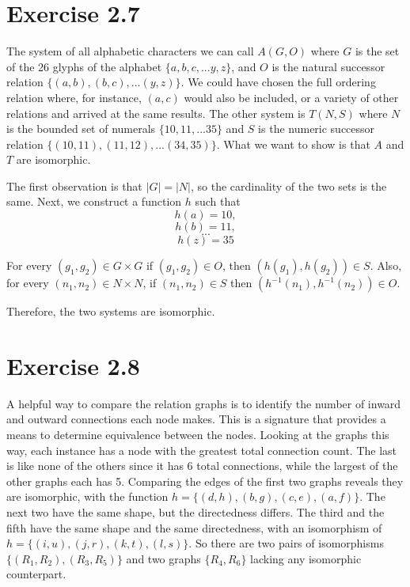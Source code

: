 \documentclass[12pt]{article}
\begin{document}
\maketitle

\section{Exercise 2.7}

The system of all alphabetic characters we can call $A(G, O)$ where $G$ is the set of the 26 glyphs of the alphabet $\{a,b,c,...y,z\}$, and $O$ is the natural successor relation $\{(a,b),(b,c),...(y,z)\}$.  We could have chosen the full ordering relation where, for instance, $(a,c)$ would also be included, or a variety of other relations and arrived at the same results.  The other system is $T(N, S)$ where $N$ is the bounded set of numerals $\{10,11,...35\}$ and $S$ is the numeric successor relation $\{(10,11),(11,12),...(34,35)\}$.  What we want to show is that $A$ and $T$ are isomorphic.  

The first observation is that $|G|=|N|$, so the cardinality of the two sets is the same.  Next, we construct a function $h$ such that $$h(a)=10,$$ 
$$h(b)=11,$$ 
$$...$$ 
$$h(z)=35$$

For every $(g_1,g_2) \in G \times G$ if $(g_1,g_2) \in O$, then $(h(g_1),h(g_2)) \in S$.  Also, for every $(n_1,n_2) \in N \times N$, if $(n_1,n_2) \in S$ then $(h^{-1}(n_1),h^{-1}(n_2)) \in O$.  

Therefore, the two systems are isomorphic.

\section{Exercise 2.8}

A helpful way to compare the relation graphs is to identify the number of inward and outward connections each node makes.  This is a signature that provides a means to determine equivalence between the nodes.  Looking at the graphs this way, each instance has a node with the greatest total connection count.  The last is like none of the others since it has 6 total connections, while the largest of the other graphs each has 5.  Comparing the edges of the first two graphs reveals they are isomorphic, with the function $h=\{(d,h),(b,g),(c,e),(a,f)\}$.  The next two have the same shape, but the directedness differs.  The third and the fifth have the same shape and the same directedness, with an isomorphism of $h=\{(i,u),(j,r),(k,t),(l,s)\}$.  So there are two pairs of isomorphisms $\{(R_1,R_2),(R_3,R_5)\}$ and two graphs $\{R_4,R_6\}$ lacking any isomorphic counterpart.
\end{document}
